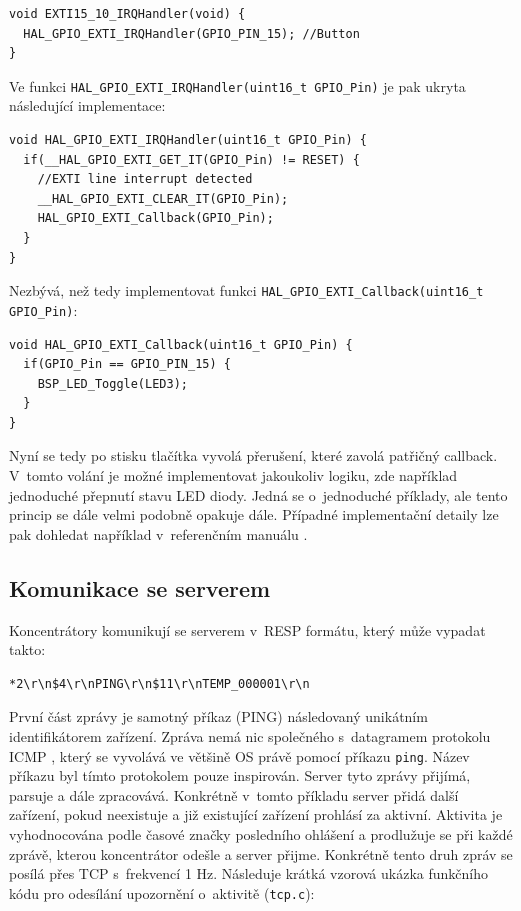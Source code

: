\begin{verbatim}
void EXTI15_10_IRQHandler(void) {
  HAL_GPIO_EXTI_IRQHandler(GPIO_PIN_15); //Button
}
\end{verbatim}

Ve funkci \texttt{HAL\_GPIO\_EXTI\_IRQHandler(uint16\_t GPIO\_Pin)} je pak u\-kry\-ta následující implementace:

\begin{verbatim}
void HAL_GPIO_EXTI_IRQHandler(uint16_t GPIO_Pin) {
  if(__HAL_GPIO_EXTI_GET_IT(GPIO_Pin) != RESET) {
    //EXTI line interrupt detected
    __HAL_GPIO_EXTI_CLEAR_IT(GPIO_Pin);
    HAL_GPIO_EXTI_Callback(GPIO_Pin);
  }
}
\end{verbatim}

Nezbývá, než tedy implementovat funkci \texttt{HAL\_GPIO\_EXTI\_Callback(uint16\_t GPIO\_Pin)}:

\begin{verbatim}
void HAL_GPIO_EXTI_Callback(uint16_t GPIO_Pin) {
  if(GPIO_Pin == GPIO_PIN_15) {
    BSP_LED_Toggle(LED3);
  }
}
\end{verbatim}

Nyní se tedy po stisku tlačítka vyvolá přerušení, které zavolá patřičný callback. V~tomto volání je možné implementovat jakoukoliv logiku, zde například jednoduché přepnutí stavu LED diody. Jedná se o~jednoduché příklady, ale tento princip se dále velmi podobně opakuje dále. Případné implementační detaily lze pak dohledat například v~referenčním manuálu \cite{manual}.

\subsection{Komunikace se serverem}
Koncentrátory komunikují se serverem v~RESP  formátu, který může vypadat takto:

\begin{verbatim}
*2\r\n$4\r\nPING\r\n$11\r\nTEMP_000001\r\n
\end{verbatim}

První část zprávy je samotný příkaz (PING) následovaný unikátním identifikátorem zařízení. Zpráva  nemá nic společného s~datagramem  protokolu ICMP \cite{icmp}, který se vyvolává ve většině OS právě pomocí příkazu \texttt{ping}. Název příkazu byl tímto protokolem pouze inspirován. Server tyto zprávy přijímá, parsuje a dále zpracovává. Konkrétně v~tomto příkladu server přidá další zařízení, pokud neexistuje a již existující zařízení prohlásí za aktivní. Aktivita je vyhodnocována podle časové značky posledního ohlášení a prodlužuje se při každé zprávě, kterou koncentrátor odešle a server přijme. Konkrétně tento druh zpráv se posílá přes TCP s~frekvencí 1 Hz. Následuje krátká vzorová ukázka funkčního kódu pro odesílání upozornění o~aktivitě (\texttt{tcp.c}):

